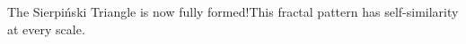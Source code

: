 \documentclass[preview]{standalone}
\begin{document}
\begin{center}
The Sierpiński Triangle is now fully formed!This fractal pattern has self-similarity at every scale.
\end{center}
\end{document}
